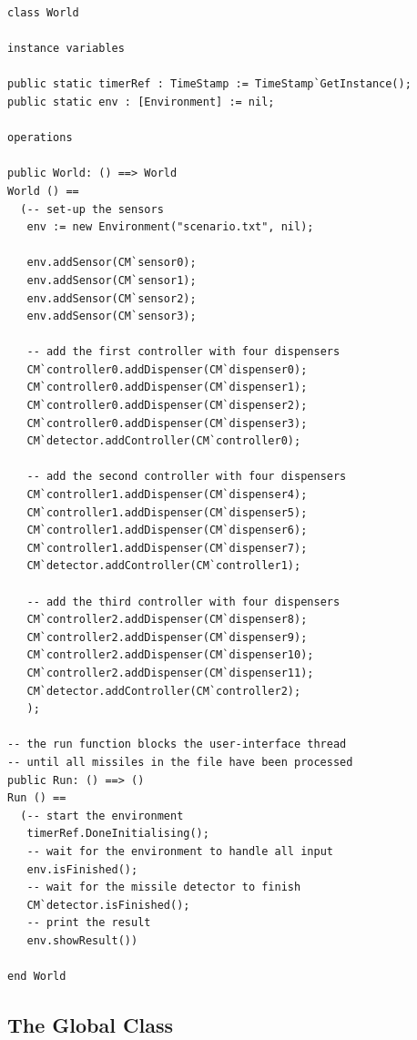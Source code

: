 \documentclass{overturerepchap}
\begin{document}
\begin{lstlisting}
class World

instance variables

public static timerRef : TimeStamp := TimeStamp`GetInstance();
public static env : [Environment] := nil;

operations

public World: () ==> World
World () ==
  (-- set-up the sensors
   env := new Environment("scenario.txt", nil);
   
   env.addSensor(CM`sensor0);
   env.addSensor(CM`sensor1);
   env.addSensor(CM`sensor2);
   env.addSensor(CM`sensor3);

   -- add the first controller with four dispensers
   CM`controller0.addDispenser(CM`dispenser0);
   CM`controller0.addDispenser(CM`dispenser1);
   CM`controller0.addDispenser(CM`dispenser2);
   CM`controller0.addDispenser(CM`dispenser3);
   CM`detector.addController(CM`controller0);

   -- add the second controller with four dispensers
   CM`controller1.addDispenser(CM`dispenser4);
   CM`controller1.addDispenser(CM`dispenser5);
   CM`controller1.addDispenser(CM`dispenser6);
   CM`controller1.addDispenser(CM`dispenser7);
   CM`detector.addController(CM`controller1);
 
   -- add the third controller with four dispensers
   CM`controller2.addDispenser(CM`dispenser8);
   CM`controller2.addDispenser(CM`dispenser9);
   CM`controller2.addDispenser(CM`dispenser10);
   CM`controller2.addDispenser(CM`dispenser11);
   CM`detector.addController(CM`controller2);   
   );

-- the run function blocks the user-interface thread
-- until all missiles in the file have been processed
public Run: () ==> ()
Run () == 
  (-- start the environment
   timerRef.DoneInitialising();
   -- wait for the environment to handle all input
   env.isFinished();
   -- wait for the missile detector to finish
   CM`detector.isFinished();
   -- print the result
   env.showResult())

end World
\end{lstlisting}

\subsection{The Global Class}
\end{document}
